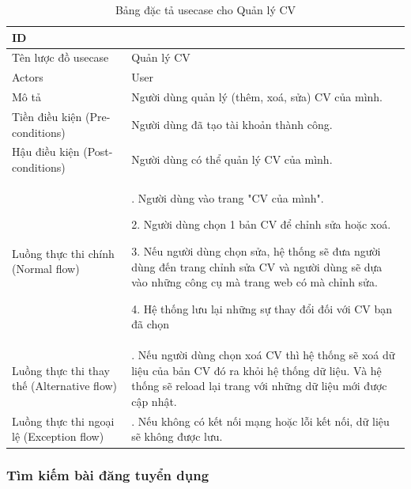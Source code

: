 \begin{table}[H]
    \centering
    \begin{tabular}{|>{\centering\arraybackslash}p{0.3\linewidth}|>{\raggedright\arraybackslash}p{0.7\linewidth}|} \hline 
         ID
& 4\\ \hline 
         
Tên lược đồ usecase
& Quản lý CV\\ \hline 
         Actors
& User\\ \hline 
         
Mô tả
& Người dùng quản lý (thêm, xoá, sửa) CV của mình.\\ \hline 
         Tiền điều kiện (Pre-conditions)
& Người dùng đã tạo tài khoản thành công.\\ \hline 
         
Hậu điều kiện (Post-conditions)& Người dùng có thể quản lý CV của mình.\\ \hline 
         Luồng thực thi chính (Normal flow)& 1. Người dùng vào trang "CV của mình".

2. Người dùng chọn 1 bản CV để chỉnh sửa hoặc xoá.

3. Nếu người dùng chọn sửa, hệ thống sẽ đưa người dùng đến trang chỉnh sửa CV và người dùng sẽ dựa vào những công cụ mà trang web có mà chỉnh sửa.

4. Hệ thống lưu lại những sự thay đổi đối với CV bạn đã chọn\\ \hline 
         
Luồng thực thi thay thế (Alternative flow)
& 3.1. Nếu người dùng chọn xoá CV thì hệ thống sẽ xoá dữ liệu của bản CV đó ra khỏi hệ thống dữ liệu. Và hệ thống sẽ reload lại trang với những dữ liệu mới được cập nhật.\\ \hline
 Luồng thực thi ngoại lệ (Exception flow)&4.1. Nếu không có kết nối mạng hoặc lỗi kết nối, dữ liệu sẽ không được lưu.\\\hline
    \end{tabular}
    \caption{Bảng đặc tả usecase cho Quản lý CV}
    \label{tab: Quản lý CV}
\end{table}



\subsubsection{Tìm kiếm bài đăng tuyển dụng}

